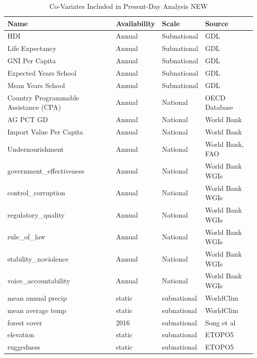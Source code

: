 \documentclass{article}
\begin{document}
\begin{table}[H]
	\begin{tabular}{llll}
		\toprule
		Name & Availability & Scale & Source \\
		\midrule
        HDI & Annual & Subnational & GDL \\
        Life Expectancy & Annual & Subnational & GDL \\
        GNI Per Capita & Annual & Subnational & GDL \\
        Expected Years School & Annual & Subnational & GDL \\
        Mean Years School & Annual & Subnational & GDL \\
        Country Programmable Assistance (CPA) & Annual & National & OECD Database \\
        AG PCT GD & Annual & National & World Bank \\
        Import Value Per Capita & Annual & National & World Bank \\
        Undernourishment & Annual & National & World Bank, FAO \\
        government_effectiveness & Annual & National & World Bank WGIs \\
        control_corruption & Annual & National & World Bank WGIs \\
        regulatory_quality & Annual & National & World Bank WGIs \\
        rule_of_law & Annual & National & World Bank WGIs \\
        stability_noviolence & Annual & National & World Bank WGIs \\
        voice_accountability & Annual & National & World Bank WGIs \\
        mean annual precip & static & subnational & WorldClim \\
        mean average temp & static & subnational & WorldClim \\
        forest cover & 2016 & subnational & Song et al \\
        elevation & static & subnational & ETOPO5 \\
        ruggedness & static & subnational & ETOPO5 \\
        
        
        
		\bottomrule
	\end{tabular}
	\caption{Co-Variates Included in Present-Day Analysis NEW}
	\label{tab:covars2}
\end{table}
\end{document}
